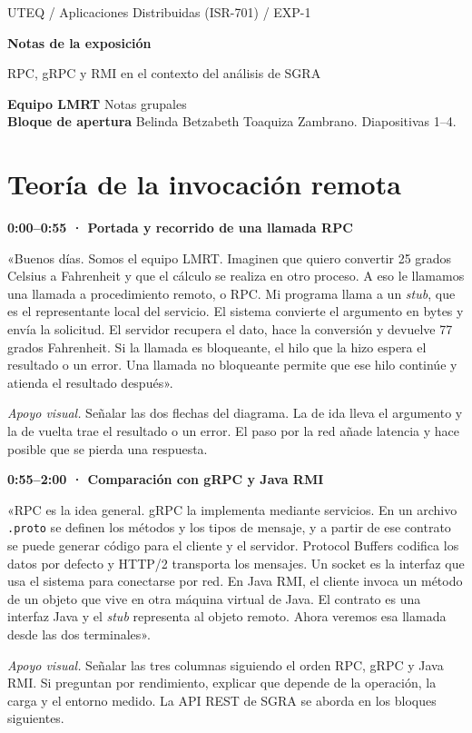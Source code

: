 \documentclass[10pt,a4paper]{article}
\begin{document}
{\small UTEQ \enspace / \enspace Aplicaciones Distribuidas (ISR-701) \enspace / \enspace EXP-1\par}
\medskip
{\LARGE\bfseries Notas de la exposición\par}
{\large RPC, gRPC y RMI en el contexto del análisis de SGRA\par}
\medskip
\textbf{Equipo LMRT} \quad Notas grupales\\
\textbf{Bloque de apertura} \quad Belinda Betzabeth Toaquiza Zambrano.
Diapositivas 1--4.

\section*{Teoría de la invocación remota}

\textbf{0:00--0:55 · Portada y recorrido de una llamada RPC}

«Buenos días. Somos el equipo LMRT. Imaginen que quiero convertir 25 grados Celsius a Fahrenheit y que el cálculo se realiza en otro proceso. A eso le llamamos una llamada a procedimiento remoto, o RPC. Mi programa llama a un \emph{stub}, que es el representante local del servicio. El sistema convierte el argumento en bytes y envía la solicitud. El servidor recupera el dato, hace la conversión y devuelve 77 grados Fahrenheit. Si la llamada es bloqueante, el hilo que la hizo espera el resultado o un error. Una llamada no bloqueante permite que ese hilo continúe y atienda el resultado después».

\textit{Apoyo visual.} Señalar las dos flechas del diagrama. La de ida lleva el argumento y la de vuelta trae el resultado o un error. El paso por la red añade latencia y hace posible que se pierda una respuesta. \cite{seemakhupt2023,kazanavicius2023}

\textbf{0:55--2:00 · Comparación con gRPC y Java RMI}

«RPC es la idea general. gRPC la implementa mediante servicios. En un archivo \texttt{.proto} se definen los métodos y los tipos de mensaje, y a partir de ese contrato se puede generar código para el cliente y el servidor. Protocol Buffers codifica los datos por defecto y HTTP/2 transporta los mensajes. Un socket es la interfaz que usa el sistema para conectarse por red. En Java RMI, el cliente invoca un método de un objeto que vive en otra máquina virtual de Java. El contrato es una interfaz Java y el \emph{stub} representa al objeto remoto. Ahora veremos esa llamada desde las dos terminales».

\textit{Apoyo visual.} Señalar las tres columnas siguiendo el orden RPC, gRPC y Java RMI. Si preguntan por rendimiento, explicar que depende de la operación, la carga y el entorno medido. La API REST de SGRA se aborda en los bloques siguientes. \cite{kaminski2023,rozek2026,darbord2023}
\end{document}
